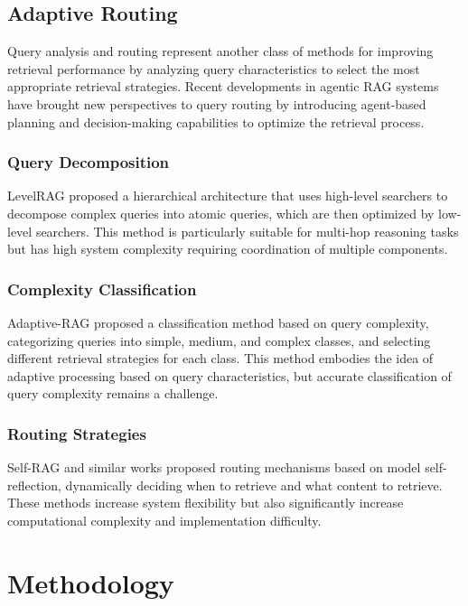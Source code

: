 \documentclass[letterpaper]{article} %
\begin{document}
\subsection{Adaptive Routing}

Query analysis and routing represent another class of methods for improving retrieval performance by analyzing query characteristics to select the most appropriate retrieval strategies. Recent developments in agentic RAG systems \cite{singh2025agentic} have brought new perspectives to query routing by introducing agent-based planning and decision-making capabilities to optimize the retrieval process.

\subsubsection{Query Decomposition}

LevelRAG \cite{jiang2023levelrag} proposed a hierarchical architecture that uses high-level searchers to decompose complex queries into atomic queries, which are then optimized by low-level searchers. This method is particularly suitable for multi-hop reasoning tasks but has high system complexity requiring coordination of multiple components.

\subsubsection{Complexity Classification}

Adaptive-RAG \cite{jeong2024adaptive} proposed a classification method based on query complexity, categorizing queries into simple, medium, and complex classes, and selecting different retrieval strategies for each class. This method embodies the idea of adaptive processing based on query characteristics, but accurate classification of query complexity remains a challenge.

\subsubsection{Routing Strategies}

Self-RAG \cite{asai2023selfrag} and similar works proposed routing mechanisms based on model self-reflection, dynamically deciding when to retrieve and what content to retrieve. These methods increase system flexibility but also significantly increase computational complexity and implementation difficulty.

\section{Methodology}
\end{document}
